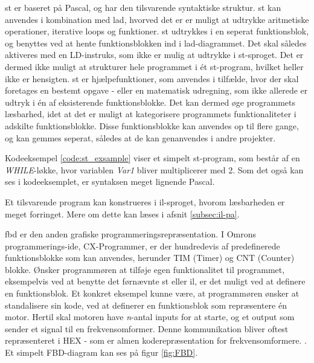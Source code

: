 \gls{st} er baseret på Pascal, og har den tilsvarende syntaktiske struktur. \gls{st} kan anvendes i kombination med \gls{lad}, hvorved det er er muligt at udtrykke aritmetiske operationer, iterative loops og funktioner. \gls{st} udtrykkes i en seperat funktionsblok, og benyttes ved at hente funktionsblokken ind i \gls{lad}-diagrammet. Det skal således aktiveres med en LD-instruks, som ikke er mulig at udtrykke i \gls{st}-sproget. Det er dermed ikke muligt at strukturer hele programmet i ét \gls{st}-program, hvilket heller ikke er hensigten. \gls{st} er hjælpefunktioner, som anvendes i tilfælde, hvor der skal foretages en bestemt opgave - eller en matematisk udregning, som ikke allerede er udtryk i én af eksisterende funktionsblokke. Det kan dermed øge programmets læsbarhed, idet at det er muligt at kategorisere programmets funktionaliteter i adskilte funktionsblokke. Disse funktionsblokke kan anvendes op til flere gange, og kan gemmes seperat, således at de kan genanvendes i andre projekter.

Kodeeksempel \ref{code:st_exsample} viser et simpelt \gls{st}-program, som består af en \textit{WHILE}-løkke, hvor variablen \textit{Var1} bliver multiplicerer med 2. Som det også kan ses i kodeeksemplet, er syntaksen meget lignende Pascal.


\noindent Et tilsvarende program kan konstrueres i \gls{il}-sproget, hvorom læsbarheden er meget forringet. Mere om dette kan læses i afsnit \ref{subsec:il-pa}. 

\gls{fbd} er den anden grafiske programmeringsrepræsentation. I Omrons programmerings-\gls{ide}, CX-Programmer, er der hundredevis af predefinerede funktionsblokke som kan anvendes, herunder TIM (Timer) og CNT (Counter) blokke. Ønsker programmøren at tilføje egen funktionalitet til programmet, eksempelvis ved at benytte det førnævnte \gls{st} eller \gls{il}, er det muligt ved at definere en funktionsblok. Et konkret eksempel kunne være, at programmøren ønsker at standalisere sin kode, ved at definerer en funktionsblok som repræsentere én motor. Hertil skal motoren have \textit{n}-antal inputs for at starte, og et output som sender et signal til en frekvensomformer. Denne kommunikation bliver oftest repræsenteret i HEX - som er almen koderepræsentation for frekvensomformere. . Et simpelt FBD-diagram kan ses på figur \ref{fig:FBD}.

